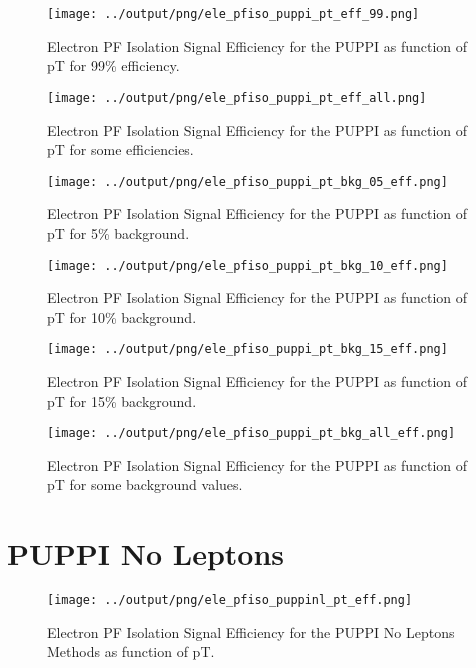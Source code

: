 \documentclass[11pt]{book}
\begin{document}
\begin{figure}[htb]
\centering
\texttt{[image: ../output/png/ele\_pfiso\_puppi\_pt\_eff\_99.png]}
\caption{Electron PF Isolation Signal Efficiency for the PUPPI as function of pT for 99\% efficiency.}
\label{fig:ele_pfiso_pt_eff_puppi_eff_99}
\end{figure}

\begin{figure}[htb]
\centering
\texttt{[image: ../output/png/ele\_pfiso\_puppi\_pt\_eff\_all.png]}
\caption{Electron PF Isolation Signal Efficiency for the PUPPI as function of pT for some efficiencies.}
\label{fig:ele_pfiso_pt_eff_puppi_eff_all}
\end{figure}

\begin{figure}[htb]
\centering
\texttt{[image: ../output/png/ele\_pfiso\_puppi\_pt\_bkg\_05\_eff.png]}
\caption{Electron PF Isolation Signal Efficiency for the PUPPI as function of pT for 5\% background.}
\label{fig:ele_pfiso_pt_bkg_puppi_bkg_05_eff}
\end{figure}

\begin{figure}[htb]
\centering
\texttt{[image: ../output/png/ele\_pfiso\_puppi\_pt\_bkg\_10\_eff.png]}
\caption{Electron PF Isolation Signal Efficiency for the PUPPI as function of pT for 10\% background.}
\label{fig:ele_pfiso_pt_bkg_puppi_bkg_10_eff}
\end{figure}

\begin{figure}[htb]
\centering
\texttt{[image: ../output/png/ele\_pfiso\_puppi\_pt\_bkg\_15\_eff.png]}
\caption{Electron PF Isolation Signal Efficiency for the PUPPI as function of pT for 15\% background.}
\label{fig:ele_pfiso_pt_bkg_puppi_bkg_15_eff}
\end{figure}

\begin{figure}[htb]
\centering
\texttt{[image: ../output/png/ele\_pfiso\_puppi\_pt\_bkg\_all\_eff.png]}
\caption{Electron PF Isolation Signal Efficiency for the PUPPI as function of pT for some background values.}
\label{fig:ele_pfiso_pt_bkg_puppi_bkg_all_eff}
\end{figure}
\clearpage

\section{PUPPI No Leptons}
\begin{figure}[htb]
\centering
\texttt{[image: ../output/png/ele\_pfiso\_puppinl\_pt\_eff.png]}
\caption{Electron PF Isolation Signal Efficiency for the PUPPI No Leptons Methods as function of pT.}
\label{fig:ele_pfiso_pt_eff_puppinl}
\end{figure}
\end{document}
